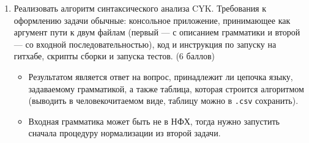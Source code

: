 \documentclass[12pt]{article}
\begin{document}
\begin{enumerate}
  \item Реализовать алгоритм синтаксического анализа CYK. Требования к оформлению задачи обычные: консольное приложение, принимающее как аргумент пути к двум файлам (первый --- с описанием грамматики и второй --- со входной последовательностью), код и инструкция по запуску на гитхабе, скрипты сборки и запуска тестов. (6 баллов)
  \begin{itemize}
      \item Результатом является ответ на вопрос, принадлежит ли цепочка языку, задаваемому грамматикой, а также таблица, которая строится алгоритмом (выводить в человекочитаемом виде, таблицу можно в \verb!.csv! сохранить).
      \item Входная грамматика может быть не в НФХ, тогда нужно запустить сначала процедуру нормализации из второй задачи. 
  \end{itemize}
  
\end{enumerate}

\end{document}

